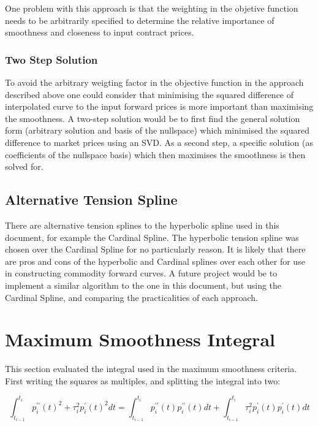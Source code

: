 \documentclass{article}
\begin{document}
\bigskip

One problem with this approach is that the weighting in the objetive function
needs to be arbitrarily specified to determine the relative importance of smoothness
and closeness to input contract prices.

\subsubsection{Two Step Solution}
To avoid the arbitrary weigting factor in the objective function in the approach 
described above one could consider that minimising the squared difference of interpolated
curve to the input forward prices is more important than maximising the smoothness.
A two-step solution would be to first find the general solution form (arbitrary solution
and basis of the nullspace) which minimised the squared difference to market
prices using an SVD. As a second step, a specific solution (as coefficients of the 
nullspace basis) which then maximises the smoothness is then solved for.

\subsection{Alternative Tension Spline}
There are alternative tension splines to the hyperbolic spline used in this 
document, for example the Cardinal Spline. The hyperbolic tension spline was chosen
over the Cardinal Spline for no particularly reason. It is likely that there are pros
and cons of the hyperbolic and Cardinal splines over each other for use in constructing commodity
forward curves. A future project would be to implement a similar algorithm to the one
in this document, but using the Cardinal Spline, and comparing the practicalities of each approach.

\newpage
\appendix
\appendixpage
\section{Maximum Smoothness Integral}
\label{appendix:max_smooth_integral}
This section evaluated the integral used in the maximum smoothness criteria. First writing
the squares as multiples, and splitting the integral into two:

\begin{equation}
    \int_{t_{i - 1}}^{t_i}p^{\prime\prime}_i(t)^2 + \tau_i^2 p^{\prime}_i(t)^2 dt
    = \int_{t_{i - 1}}^{t_i}p^{\prime\prime}_i(t) p^{\prime\prime}_i(t) dt +
    \int_{t_{i - 1}}^{t_i} \tau_i^2 p^{\prime}_i(t) p^{\prime}_i(t) dt
\end{equation}
\end{document}
